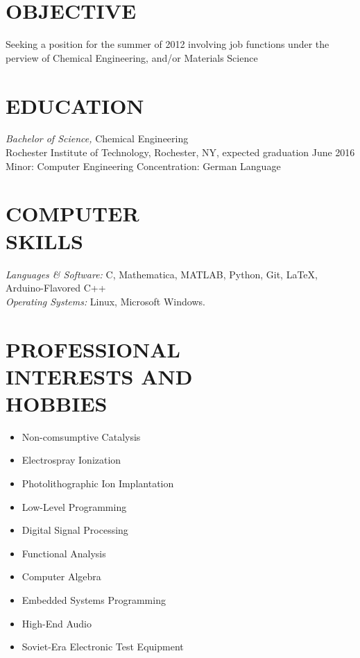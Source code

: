 \documentclass[line,margin]{res}
\begin{document}
\address{3241 Nathaniel Rochester Hall, Rochester, NY 14623}
\address{(315) 391-7268}
\address{tmw4661@rit.edu}

\begin{resume}
 
\section{OBJECTIVE}       Seeking a position for the summer of 2012 involving
						  job functions under the perview of Chemical Engineering,
						  and/or Materials Science
 
 
\section{EDUCATION} {\sl Bachelor of Science,} Chemical Engineering \\
                Rochester Institute of Technology, Rochester, NY, 
                expected graduation June 2016 \\
                Minor: Computer Engineering
                Concentration: German Language \\
\section{COMPUTER \\ SKILLS} {\sl Languages \& Software:} C, Mathematica,
						MATLAB, Python, Git, \LaTeX, Arduino-Flavored C++\\
                {\sl Operating Systems:} Linux, Microsoft Windows.

\section{PROFESSIONAL \\ INTERESTS AND \\ HOBBIES}
				\begin{itemize} \itemsep -2pt
				\item	Non-comsumptive Catalysis
				\item	Electrospray Ionization
				\item	Photolithographic Ion Implantation
				\item	Low-Level Programming
				\item	Digital Signal Processing
				\item	Functional Analysis
				\item	Computer Algebra
				\item	Embedded Systems Programming
				\item	High-End Audio
				\item	Soviet-Era Electronic Test Equipment
				\end{itemize}
 

\end{resume}
\end{document}
